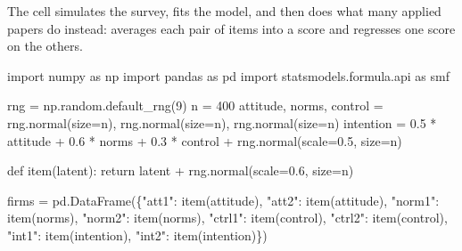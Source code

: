 \documentclass[
  letterpaper,
  10pt,
  twoside,
  openright,
  numbers=noenddot,
  chapterprefix=true]{scrbook}
\newenvironment{Shaded}{}{}
\newcommand{\ControlFlowTok}[1]{\textcolor[rgb]{0.84,0.23,0.29}{#1}}
\newcommand{\DecValTok}[1]{\textcolor[rgb]{0.00,0.36,0.77}{#1}}
\newcommand{\FloatTok}[1]{\textcolor[rgb]{0.00,0.36,0.77}{#1}}
\newcommand{\ImportTok}[1]{\textcolor[rgb]{0.01,0.18,0.38}{#1}}
\newcommand{\KeywordTok}[1]{\textcolor[rgb]{0.84,0.23,0.29}{#1}}
\newcommand{\NormalTok}[1]{\textcolor[rgb]{0.14,0.16,0.18}{#1}}
\newcommand{\OperatorTok}[1]{\textcolor[rgb]{0.14,0.16,0.18}{#1}}
\newcommand{\StringTok}[1]{\textcolor[rgb]{0.01,0.18,0.38}{#1}}
\begin{document}
The cell simulates the survey, fits the model, and then does what many
applied papers do instead: averages each pair of items into a score and
regresses one score on the others.

\label{check-tpb}
\begin{Shaded}
\begin{Highlighting}[]
\ImportTok{import}\NormalTok{ numpy }\ImportTok{as}\NormalTok{ np}
\ImportTok{import}\NormalTok{ pandas }\ImportTok{as}\NormalTok{ pd}
\ImportTok{import}\NormalTok{ statsmodels.formula.api }\ImportTok{as}\NormalTok{ smf}

\NormalTok{rng }\OperatorTok{=}\NormalTok{ np.random.default\_rng(}\DecValTok{9}\NormalTok{)}
\NormalTok{n }\OperatorTok{=} \DecValTok{400}
\NormalTok{attitude, norms, control }\OperatorTok{=}\NormalTok{ rng.normal(size}\OperatorTok{=}\NormalTok{n), rng.normal(size}\OperatorTok{=}\NormalTok{n), rng.normal(size}\OperatorTok{=}\NormalTok{n)}
\NormalTok{intention }\OperatorTok{=} \FloatTok{0.5} \OperatorTok{*}\NormalTok{ attitude }\OperatorTok{+} \FloatTok{0.6} \OperatorTok{*}\NormalTok{ norms }\OperatorTok{+} \FloatTok{0.3} \OperatorTok{*}\NormalTok{ control }\OperatorTok{+}\NormalTok{ rng.normal(scale}\OperatorTok{=}\FloatTok{0.5}\NormalTok{, size}\OperatorTok{=}\NormalTok{n)}

\KeywordTok{def}\NormalTok{ item(latent):}
    \ControlFlowTok{return}\NormalTok{ latent }\OperatorTok{+}\NormalTok{ rng.normal(scale}\OperatorTok{=}\FloatTok{0.6}\NormalTok{, size}\OperatorTok{=}\NormalTok{n)}

\NormalTok{firms }\OperatorTok{=}\NormalTok{ pd.DataFrame(\{}\StringTok{"att1"}\NormalTok{: item(attitude), }\StringTok{"att2"}\NormalTok{: item(attitude),}
                      \StringTok{"norm1"}\NormalTok{: item(norms), }\StringTok{"norm2"}\NormalTok{: item(norms),}
                      \StringTok{"ctrl1"}\NormalTok{: item(control), }\StringTok{"ctrl2"}\NormalTok{: item(control),}
                      \StringTok{"int1"}\NormalTok{: item(intention), }\StringTok{"int2"}\NormalTok{: item(intention)\})}


\end{Highlighting}
\end{Shaded}
\end{document}
